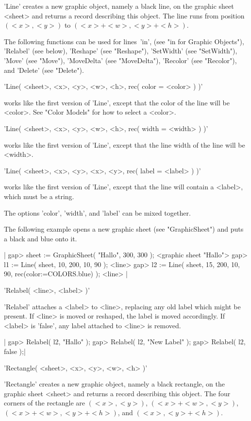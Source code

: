 'Line' creates a new graphic object, namely  a black line, on the graphic
sheet  <sheet> and returns a  {\GAP} record describing  this object.  The
line runs from position $(<x>,<y>)$ to $(<x>+<w>,<y>+<h>)$.

The following  functions  can be used   for lines\:\  'in',  (see "in for
Graphic  Objects"),  'Relabel'  (see  below), 'Reshape' (see  "Reshape"),
'SetWidth'  (see  "SetWidth"),   'Move'  (see "Move"),  'MoveDelta'  (see
"MoveDelta"), 'Recolor' (see "Recolor"), and 'Delete' (see "Delete").

'Line( <sheet>, <x>, <y>, <w>, <h>, rec( color \:= <color> ) )'

works like the first version of 'Line', except that the color of the line
will be <color>.  See "Color Models" for how to select a <color>.

'Line( <sheet>, <x>, <y>, <w>, <h>, rec( width \:= <width> ) )'

works like the first version of 'Line', except that the line width of the
line will be <width>.

'Line( <sheet>, <x>, <y>, <x>, <y>, rec( label \:= <label> ) )'

works like the first version of 'Line', except that the line will contain
a <label>, which must be a string.

The options 'color', 'width', and 'label' can be mixed together.

The following example opens a  new graphic sheet (see "GraphicSheet") and
puts a black and blue onto it.

|    gap> sheet := GraphicSheet( "Hallo", 300, 300 );
    <graphic sheet "Hallo">
    gap> l1 := Line( sheet, 10, 200, 10, 90 );
    <line>
    gap> l2 := Line( sheet, 15, 200, 10, 90, rec(color:=COLORS.blue) );
    <line> |

'Relabel( <line>, <label> )'

'Relabel' attaches a  <label> to  <line>,  replacing any old label  which
might be  present.  If <line> is moved  or  reshaped, the label  is moved
accordingly.   If  <label> is 'false', any   label attached to  <line> is
removed.

|    gap> Relabel( l2, "Hallo" );
    gap> Relabel( l2, "New Label" );
    gap> Relabel( l2, false );|


'Rectangle( <sheet>, <x>, <y>, <w>, <h> )'

'Rectangle' creates  a new graphic object, namely  a black  rectangle, on
the  graphic sheet  <sheet> and returns  a  {\GAP} record describing this
object.  The  four     corners   of  the  rectangle  are     $(<x>,<y>)$,
$(<x>+<w>,<y>)$, $(<x>+<w>,<y>+<h>)$, and $(<x>,<y>+<h>)$.

